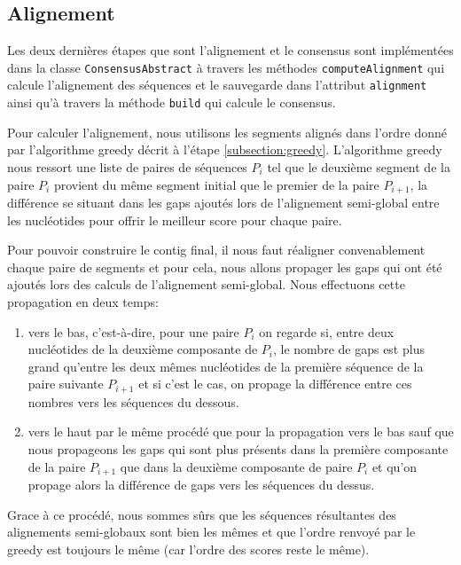 
\subsection{Alignement}
\label{subsection:alignment}

Les deux dernières étapes que sont l'alignement et le consensus sont
implémentées dans la classe \verb|ConsensusAbstract| à travers les méthodes
\verb|computeAlignment| qui calcule l'alignement des séquences et le sauvegarde
dans l'attribut \verb|alignment| ainsi qu'à travers la méthode \verb|build|
qui calcule le consensus.

Pour calculer l'alignement, nous utilisons les segments alignés dans l'ordre
donné par l'algorithme greedy décrit à l'étape \ref{subsection:greedy}.
L'algorithme greedy nous ressort une liste de paires de séquences $P_{i}$ tel
que le deuxième segment de la paire $P_{i}$ provient du même segment initial que
le premier de la paire $P_{i + 1}$, la différence se situant dans les gaps
ajoutés lors de l'alignement semi-global entre les nucléotides pour offrir le
meilleur score pour chaque paire.

Pour pouvoir construire le contig final, il nous faut réaligner convenablement
chaque paire de segments et pour cela, nous allons propager les gaps qui ont été
ajoutés lors des calculs de l'alignement semi-global. Nous effectuons cette
propagation en deux temps:

\begin{enumerate}
	\item vers le bas, c'est-à-dire, pour une paire $P_{i}$ on regarde si, entre
		deux nucléotides de la deuxième composante de $P_{i}$, le
		nombre de gaps est plus grand qu'entre les deux mêmes nucléotides de la première
		séquence de la paire suivante $P_{i + 1}$ et si c'est le cas, on propage la
		différence entre ces nombres vers les séquences du dessous.
	\item vers le haut par le même procédé que pour la propagation vers le bas
		sauf que nous propageons les gaps qui sont plus présents dans la
		première composante de la paire $P_{i + 1}$ que dans la deuxième
		composante de paire $P_{i}$ et qu'on propage alors la différence de gaps
		vers les séquences du dessus.
\end{enumerate}

Grace à ce procédé, nous sommes sûrs que les séquences résultantes des
alignements semi-globaux sont bien les mêmes et que l'ordre renvoyé par le greedy
est toujours le même (car l'ordre des scores reste le même).

